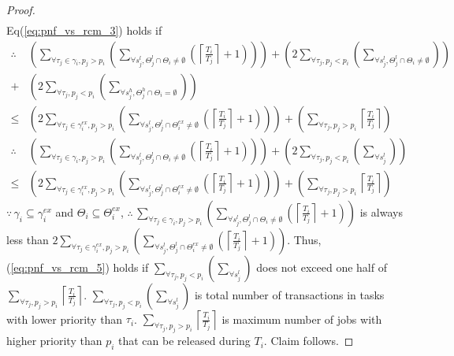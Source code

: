 \begin{proof}
\begin{eqnarray}
\end{eqnarray}
%
Eq(\ref{eq:pnf_vs_rcm_3}) holds if 
%
\begin{eqnarray}
\therefore & \left(\sum_{\forall\tau_{j}\in\gamma_{i},p_{j}>p_{i}}\left(\sum_{\forall s_{j}^{l},\Theta_{j}^{l}\cap\Theta_{i}\neq\emptyset}\left(\left\lceil \frac{T_{i}}{T_{j}}\right\rceil +1\right)\right)\right)+\left(2\sum_{\forall\tau_{j},p_{j}<p_{i}}\left(\sum_{\forall s_{j}^{l},\Theta_{j}^{l}\cap\Theta_{i}\neq\emptyset}\right)\right) \nonumber\\
+ & \left(2\sum_{\forall\tau_{j},p_{j}<p_{i}}\left(\sum_{\forall s_{j}^{h},\Theta_{j}^{h}\cap\Theta_{i}=\emptyset}\right)\right)\nonumber \\
\le & \left(2\sum_{\forall\tau_{j}\in\gamma_{i}^{ex},p_{j}>p_{i}}\left(\sum_{\forall s_{j}^{l},\Theta_{j}^{l}\cap\Theta_{i}^{ex}\neq\emptyset}\left(\left\lceil \frac{T_{i}}{T_{j}}\right\rceil +1\right)\right)\right)+\left(\sum_{\forall\tau_{j},p_{j}>p_{i}}\left\lceil \frac{T_{i}}{T_{j}}\right\rceil \right)\label{eq:pnf_vs_rcm_4}
\end{eqnarray}
%
\begin{eqnarray}
\therefore & \left(\sum_{\forall\tau_{j}\in\gamma_{i},p_{j}>p_{i}}\left(\sum_{\forall s_{j}^{l},\Theta_{j}^{l}\cap\Theta_{i}\neq\emptyset}\left(\left\lceil \frac{T_{i}}{T_{j}}\right\rceil +1\right)\right)\right)+\left(2\sum_{\forall\tau_{j},p_{j}<p_{i}}\left(\sum_{\forall s_{j}^{l}}\right)\right)\nonumber \\
\le & \left(2\sum_{\forall\tau_{j}\in\gamma_{i}^{ex},p_{j}>p_{i}}\left(\sum_{\forall s_{j}^{l},\Theta_{j}^{l}\cap\Theta_{i}^{ex}\neq\emptyset}\left(\left\lceil \frac{T_{i}}{T_{j}}\right\rceil +1\right)\right)\right)+\left(\sum_{\forall\tau_{j},p_{j}>p_{i}}\left\lceil \frac{T_{i}}{T_{j}}\right\rceil \right)\label{eq:pnf_vs_rcm_5}
\end{eqnarray}
%
$\because\,\gamma_{i}\subseteq\gamma_{i}^{ex}$ and $\Theta_{i}\subseteq\Theta_{i}^{ex}$,
$\therefore\,\sum_{\forall\tau_{j}\in\gamma_{i},p_{j}>p_{i}}\left(\sum_{\forall s_{j}^{l},\Theta_{j}^{l}\cap\Theta_{i}\neq\emptyset}\left(\left\lceil \frac{T_{i}}{T_{j}}\right\rceil +1\right)\right)$ is always less than $2\sum_{\forall\tau_{j}\in\gamma_{i}^{ex},p_{j}>p_{i}}\left(\sum_{\forall s_{j}^{l},\Theta_{j}^{l}\cap\Theta_{i}^{ex}\neq\emptyset}\left(\left\lceil \frac{T_{i}}{T_{j}}\right\rceil +1\right)\right)$.
Thus, (\ref{eq:pnf_vs_rcm_5}) holds if $\sum_{\forall\tau_{j},p_{j}<p_{i}}\left(\sum_{\forall s_{j}^{l}}\right)$ does not exceed one half of $\sum_{\forall\tau_{j},p_{j}>p_{i}}\left\lceil \frac{T_{i}}{T_{j}}\right\rceil $. $\sum_{\forall\tau_{j},p_{j}<p_{i}}\left(\sum_{\forall s_{j}^{l}}\right)$
is total number of transactions in tasks with lower priority than
$\tau_{i}$. $\sum_{\forall\tau_{j},p_{j}>p_{i}}\left\lceil \frac{T_{i}}{T_{j}}\right\rceil $
is maximum number of jobs with higher priority than $p_{i}$ that can be released during $T_{i}$. Claim follows.
%
\end{proof}
%
